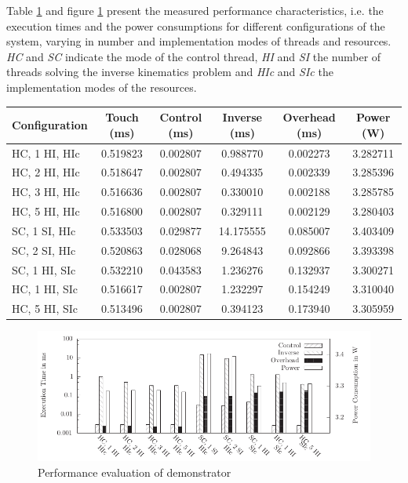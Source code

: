 Table \ref{tab:demo_perf} and figure \ref{fig:demo_perf} present the measured
performance characteristics, i.e. the execution times and the power
consumptions for different configurations of the system, varying in number and
implementation modes of threads and resources. \emph{HC} and \emph{SC}
indicate the mode of the control thread, \emph{HI} and \emph{SI} the number of
threads solving the inverse kinematics problem and \emph{HIc} and \emph{SIc}
the implementation modes of the resources.
\begin{table}
	\scriptsize
	\centering
	\label{tab:demo_perf}
	\begin{tabular}{lccccc}
	\hline
	\textbf{Configuration} & \textbf{Touch (ms)} & \textbf{Control (ms)} & \textbf{Inverse (ms)} & \textbf{Overhead (ms)} & \textbf{Power (W)}\\
	\hline
	HC, 1 HI, HIc & 0.519823 & 0.002807 & 0.988770 & 0.002273 & 3.282711\\
	HC, 2 HI, HIc & 0.518647 & 0.002807 & 0.494335 & 0.002339 & 3.285396\\
	HC, 3 HI, HIc & 0.516636 & 0.002807 & 0.330010 & 0.002188 & 3.285785\\
	HC, 5 HI, HIc & 0.516800 & 0.002807 & 0.329111 & 0.002129 & 3.280403\\
	SC, 1 SI, HIc & 0.533503 & 0.029877 & 14.175555 & 0.085007 & 3.403409\\
	SC, 2 SI, HIc & 0.520863 & 0.028068 & 9.264843 & 0.092866 & 3.393398\\
	SC, 1 HI, SIc & 0.532210 & 0.043583 & 1.236276 & 0.132937 & 3.300271\\
	HC, 1 HI, SIc & 0.516617 & 0.002807 & 1.232297 & 0.154249 & 3.310040\\
	HC, 5 HI, SIc & 0.513496 & 0.002807 & 0.394123 & 0.173940 & 3.305959\\
	\hline
	\end{tabular}
\end{table}
\begin{figure}
	\centering
	\includegraphics{../figures/demo_perf}
	\caption{Performance evaluation of demonstrator}
	\label{fig:demo_perf}
\end{figure}

